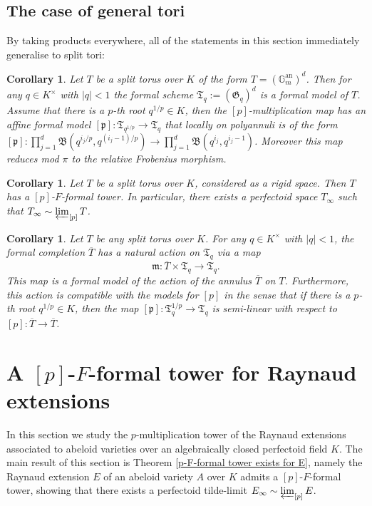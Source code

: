 \documentclass[10pt,oneside]{amsart}
\newtheorem{corollary}[theorem]{Corollary}
\theoremstyle{definition}
\begin{document}
	\subsection{The case of general tori}
	By taking products everywhere, all of the statements in this section immediately generalise to split tori:
	\begin{corollary}\label{torus has formal models}
		Let $T$ be a split torus over $K$ of the form $T=(\mathbb G_m^{\operatorname{an}})^d$. Then for any $q\in K^\times$ with $|q|<1$ the formal scheme $\mathfrak T_q := (\mathfrak G_q)^d$ is a formal model of $T$. Assume that there is a $p$-th root $q^{1/p}\in K$, then the $[p]$-multiplication map has an affine formal model $[\mathfrak p]:\mathfrak T_{q^{1/p}}\rightarrow \mathfrak T_{q}$ that locally on polyannuli is of the form $[\mathfrak p]:\prod_{j=1}^d \mathfrak B(q^{i_j/p},q^{(i_j-1)/p})\rightarrow \prod_{j=1}^d \mathfrak B(q^{i_j},q^{i_j-1})$. Moreover this map reduces mod $\pi$ to the relative Frobenius morphism.
	\end{corollary}
	\begin{corollary}\label{torus has p-F-formal tower and has perfectoid tilde-limit}
		Let $T$ be a split torus over $K$, considered as a rigid space. Then $T$ has a $[p]$-$F$-formal tower. In particular, there exists a perfectoid space $T_\infty$ such that $T_\infty \sim \varprojlim_{[p]} T$. 
	\end{corollary}
	
	\begin{corollary}\label{action on formal model of torus, case of general tori}
		Let $T$ be any split torus over $K$. For any $q\in K^\times$ with $|q|<1$, the formal completion $\overline{T}$ has a natural action on $\mathfrak T_q$ via a map
		\[\mathfrak m:\overline{T}\times \mathfrak T_q\rightarrow \mathfrak T_q.\]
		This map is a formal model of the action of the annulus $\overline{T}$ on $T$. Furthermore, this action is compatible with the models for $[p]$ in the sense that if there is a $p$-th root $q^{1/p}\in K$, then the map $[\mathfrak p]:\mathfrak T_q^{1/p}\rightarrow \mathfrak T_q$ is semi-linear with respect to $[p]:\overline{T}\rightarrow \overline{T}$.
	\end{corollary}  
	
	

	\section{A $[p]$-$F$-formal tower for Raynaud extensions}\label{Raynaud extensions as principal bundles of formal and rigid spaces}
	In this section we study the $p$-multiplication tower of the Raynaud extensions associated to abeloid varieties over an algebraically closed perfectoid field $K$. The main result of this section is Theorem \ref{p-F-formal tower exists for E}, namely the Raynaud extension $E$ of an abeloid variety $A$ over $K$ admits a $[p]$-$F$-formal tower, showing that there exists a perfectoid tilde-limit $E_\infty \sim \varprojlim_{[p]} E$.  
	
\end{document}
